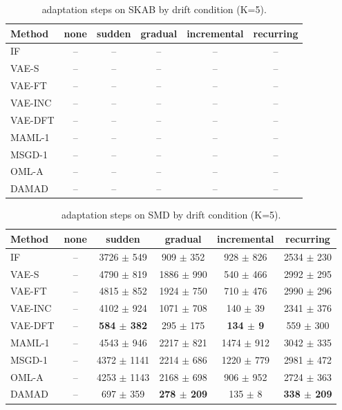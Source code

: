 \begin{table}[t]
\centering
\small
\caption{adaptation steps on SKAB by drift condition (K=5).}
\label{tab:drift_adaptation_steps_skab}
\begin{tabular}{lccccc}
\toprule
Method & none & sudden & gradual & incremental & recurring \\
\midrule
IF & – & – & – & – & – \\
VAE-S & – & – & – & – & – \\
VAE-FT & – & – & – & – & – \\
VAE-INC & – & – & – & – & – \\
VAE-DFT & – & – & – & – & – \\
MAML-1 & – & – & – & – & – \\
MSGD-1 & – & – & – & – & – \\
OML-A & – & – & – & – & – \\
DAMAD & – & – & – & – & – \\
\bottomrule
\end{tabular}
\end{table}

\begin{table}[t]
\centering
\small
\caption{adaptation steps on SMD by drift condition (K=5).}
\label{tab:drift_adaptation_steps_smd}
\begin{tabular}{lccccc}
\toprule
Method & none & sudden & gradual & incremental & recurring \\
\midrule
IF & – & 3726 $\pm$ 549 & 909 $\pm$ 352 & 928 $\pm$ 826 & 2534 $\pm$ 230 \\
VAE-S & – & 4790 $\pm$ 819 & 1886 $\pm$ 990 & 540 $\pm$ 466 & 2992 $\pm$ 295 \\
VAE-FT & – & 4815 $\pm$ 852 & 1924 $\pm$ 750 & 710 $\pm$ 476 & 2990 $\pm$ 296 \\
VAE-INC & – & 4102 $\pm$ 924 & 1071 $\pm$ 708 & 140 $\pm$ 39 & 2341 $\pm$ 376 \\
VAE-DFT & – & \textbf{584 $\pm$ 382} & 295 $\pm$ 175 & \textbf{134 $\pm$ 9} & 559 $\pm$ 300 \\
MAML-1 & – & 4543 $\pm$ 946 & 2217 $\pm$ 821 & 1474 $\pm$ 912 & 3042 $\pm$ 335 \\
MSGD-1 & – & 4372 $\pm$ 1141 & 2214 $\pm$ 686 & 1220 $\pm$ 779 & 2981 $\pm$ 472 \\
OML-A & – & 4253 $\pm$ 1143 & 2168 $\pm$ 698 & 906 $\pm$ 952 & 2724 $\pm$ 363 \\
DAMAD & – & 697 $\pm$ 359 & \textbf{278 $\pm$ 209} & 135 $\pm$ 8 & \textbf{338 $\pm$ 209} \\
\bottomrule
\end{tabular}
\end{table}

